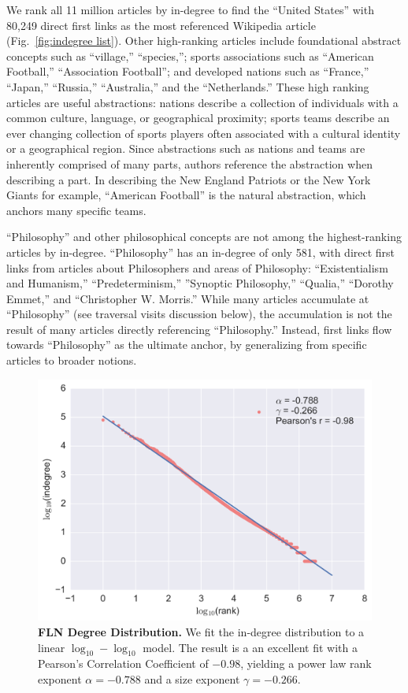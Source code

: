 \documentclass[pre,twocolumn,twoside,superscriptaddress,floatfix, aps, 10pt]{revtex4-1}
\begin{document}
We rank all 11 million articles by in-degree to find 
the ``United States'' with 80,249 direct first links as the most referenced
Wikipedia article 
(Fig.~\ref{fig:indegree list}). 
Other high-ranking articles
include foundational abstract concepts such as ``village,'' ``species,''; 
sports associations such as ``American Football,'' ``Association Football''; 
and developed nations such as ``France,'' ``Japan,'' ``Russia,'' ``Australia,'' and 
the ``Netherlands.'' These high ranking articles are useful abstractions: nations
describe a collection of individuals with a common culture, language, or 
geographical proximity; sports teams describe an ever changing collection of 
sports players often associated with a cultural identity or a geographical 
region. 
Since abstractions such as nations and teams are inherently comprised
of many parts, authors reference the abstraction when describing a part.
In describing the New England Patriots or the New York Giants
for example, ``American Football'' is the natural abstraction, which 
anchors many specific teams.

``Philosophy'' and other philosophical concepts
are not among the highest-ranking articles by in-degree.
``Philosophy'' has an in-degree of only 581, with direct first links from articles about Philosophers and areas of Philosophy: ``Existentialism and Humanism,'' ``Predeterminism,'' ''Synoptic Philosophy,'' ``Qualia,'' ``Dorothy Emmet,'' and ``Christopher W. Morris.''
While many articles accumulate at ``Philosophy'' (see traversal visits discussion below), 
the accumulation is not the 
result of many articles directly referencing ``Philosophy.'' 
Instead, first links flow towards ``Philosophy'' as the 
ultimate anchor, by generalizing from specific articles to broader notions.

\begin{figure}[tp!]
  \includegraphics[width=\columnwidth]{graphics/ndegree_loglog.png}
  \caption{
    \textbf{FLN Degree Distribution.}
We fit the in-degree distribution to a linear $\log_{10}-\log_{10}$ model. The result is a 
an excellent fit with a Pearson's Correlation Coefficient of $-0.98$, yielding a 
power law rank exponent $\alpha = -0.788$ and a size exponent $\gamma = -0.266$. 
}
  \label{fig:degree distribution}
\end{figure}
\end{document}
